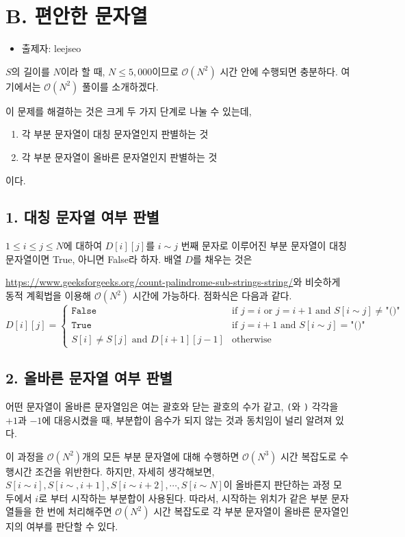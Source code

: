 \documentclass{article}
\begin{document}
	\section{B. 편안한 문자열}
	\begin{itemize}
		\item 출제자: leejseo
	\end{itemize}
	$S$의 길이를 $N$이라 할 때, $N \le 5,000$이므로 $\mathcal{O}(N^2)$ 시간 안에 수행되면 충분하다. 여기에서는 $\mathcal{O}(N^2)$ 풀이를 소개하겠다.\newline
	
	이 문제를 해결하는 것은 크게 두 가지 단계로 나눌 수 있는데,
	\begin{enumerate}
		\item 각 부분 문자열이 대칭 문자열인지 판별하는 것
		\item 각 부분 문자열이 올바른 문자열인지 판별하는 것
	\end{enumerate}
	이다.
	\subsection{1. 대칭 문자열 여부 판별}
	$1 \le i \le j\le N$에 대하여 $D[i][j]$를 $i \sim j$ 번째 문자로 이루어진 부분 문자열이 대칭 문자열이면 True, 아니면 False라 하자. 배열 $D$를 채우는 것은
	
	\url{https://www.geeksforgeeks.org/count-palindrome-sub-strings-string/}와 비슷하게 동적 계획법을 이용해 $\mathcal{O}(N^2)$ 시간에 가능하다. 점화식은 다음과 같다.
	$$D[i][j] = 
	\begin{cases}
	\texttt{False} & \text{if }j=i \text{ or } j = i+1 \text{ and }  S[i \sim j] \neq \texttt{"()"} \\
	\texttt{True} & \text{if } j=i+1 \text{ and }  S[i \sim j] = \texttt{"()"} \\
	S[i]\neq S[j] \text{ and } D[i+1][j-1] & \text{otherwise}
	\end{cases}
	$$
	\subsection{2. 올바른 문자열 여부 판별}
	어떤 문자열이 올바른 문자열임은 여는 괄호와 닫는 괄호의 수가 같고, \texttt{(}와 \texttt{)} 각각을 $+1$과 $-1$에 대응시켰을 때, 부분합이 음수가 되지 않는 것과 동치임이 널리 알려져 있다.\newline
	
	이 과정을 $\mathcal{O}(N^2)$개의 모든 부분 문자열에 대해 수행하면 $\mathcal{O}(N^3)$ 시간 복잡도로 수행시간 조건을 위반한다. 하지만, 자세히 생각해보면, $S[i\sim i], S[i\sim, i+1], S[i\sim i+2], \cdots, S[i \sim N]$이 올바른지 판단하는 과정 모두에서 $i$로 부터 시작하는 부분합이 사용된다. 따라서, 시작하는 위치가 같은 부분 문자열들을 한 번에 처리해주면 $\mathcal{O}(N^2)$ 시간 복잡도로 각 부분 문자열이 올바른 문자열인지의 여부를 판단할 수 있다.
		
\end{document}
